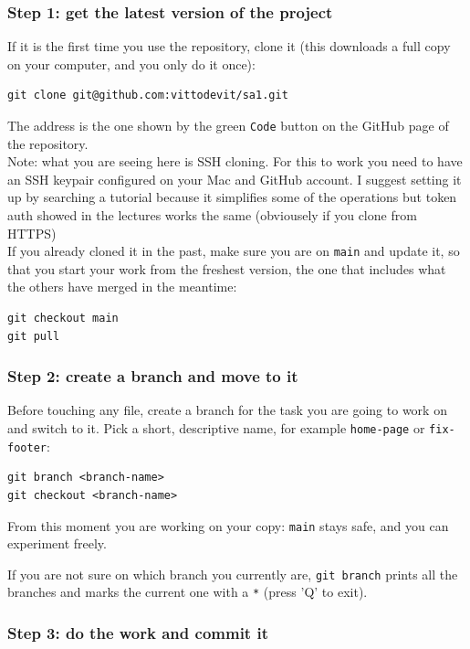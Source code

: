 \subsubsection{Step 1: get the latest version of the project}
\label{sec:git-step1}

If it is the first time you use the repository, clone it (this downloads a
full copy on your computer, and you only do it once):
\begin{verbatim}
git clone git@github.com:vittodevit/sa1.git
\end{verbatim}
The address is the one shown by the green \texttt{Code} button on the GitHub
page of the repository.\\

{\small Note: what you are seeing here is SSH cloning. For this to work you
need to have an SSH keypair configured on your Mac and GitHub account.
I suggest setting it up by searching a tutorial because it simplifies some
of the operations but token auth showed in the lectures works the same
(obviousely if you clone from HTTPS)}\\

If you already cloned it in the past, make sure you are on \texttt{main} and
update it, so that you start your work from the freshest version, the one
that includes what the others have merged in the meantime:
\begin{verbatim}
git checkout main
git pull
\end{verbatim}

\subsubsection{Step 2: create a branch and move to it}
\label{sec:git-step2}

Before touching any file, create a branch for the task you are going to work
on and switch to it. Pick a short, descriptive name, for example
\texttt{home-page} or \texttt{fix-footer}:
\begin{verbatim}
git branch <branch-name>
git checkout <branch-name>
\end{verbatim}
From this moment you are working on your copy: \texttt{main} stays safe, and
you can experiment freely.

If you are not sure on which branch you currently are, \texttt{git branch}
prints all the branches and marks the current one with a \texttt{*} (press 'Q' to exit).

\subsubsection{Step 3: do the work and commit it}
\label{sec:git-step3}

